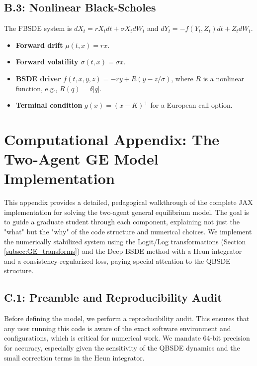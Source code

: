 \subsection{B.3: Nonlinear Black-Scholes}
The FBSDE system is \(dX_t = rX_t dt + \sigma X_t dW_t\) and \(dY_t = -f(Y_t, Z_t)dt + Z_t dW_t\).
\begin{itemize}
    \item \textbf{Forward drift} \(\mu(t,x) = rx\).
    \item \textbf{Forward volatility} \(\sigma(t,x) = \sigma x\).
    \item \textbf{BSDE driver} \(f(t,x,y,z) = -ry + R(y - z/\sigma)\), where \(R\) is a nonlinear function, e.g., \(R(q) = \delta |q|\).
    \item \textbf{Terminal condition} \(g(x) = (x-K)^+\) for a European call option.
\end{itemize}

\section{Computational Appendix: The Two-Agent GE Model Implementation}
\label{app:GE_impl}

This appendix provides a detailed, pedagogical walkthrough of the complete JAX implementation for solving the two-agent general equilibrium model. The goal is to guide a graduate student through each component, explaining not just the "what" but the "why" of the code structure and numerical choices. We implement the numerically stabilized system using the Logit/Log transformations (Section \ref{subsec:GE_transforms}) and the Deep BSDE method with a Heun integrator and a consistency-regularized loss, paying special attention to the QBSDE structure.

\subsection{C.1: Preamble and Reproducibility Audit}
Before defining the model, we perform a reproducibility audit. This ensures that any user running this code is aware of the exact software environment and configurations, which is critical for numerical work. We mandate 64-bit precision for accuracy, especially given the sensitivity of the QBSDE dynamics and the small correction terms in the Heun integrator.

